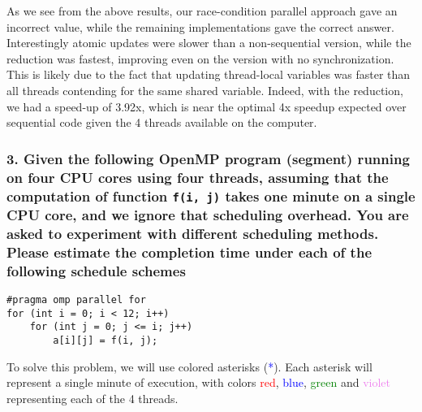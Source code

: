 \documentclass[titlepage]{article}
\def\code#1{\texttt{#1}}
\begin{document}
As we see from the above results, our race-condition parallel
approach gave an incorrect value, while the remaining
implementations gave the correct answer. Interestingly
atomic updates were slower than a non-sequential version,
while the reduction was fastest, improving even on the version
with no synchronization. This is likely due to the fact that updating
thread-local variables was faster than all threads contending for
the same shared variable. Indeed, with the reduction, we had a
speed-up of 3.92x, which is near the optimal 4x speedup expected over
sequential code given the 4 threads available on the computer.
\subsubsection*{3. Given the following OpenMP program (segment) running on 
four CPU cores using four threads, assuming that the computation of function
\code{f(i, j)} takes one minute on a single CPU core, and we ignore that scheduling
overhead. You are asked to experiment with different scheduling methods. 
Please estimate the completion time under each of the following schedule schemes}
\begin{minipage}{\linewidth}
\begin{lstlisting}[style=CStyle]
#pragma omp parallel for
for (int i = 0; i < 12; i++)
    for (int j = 0; j <= i; j++)
        a[i][j] = f(i, j);
\end{lstlisting}
\end{minipage}
To solve this problem, we will use colored asterisks (\textcolor{blue}{*}).
Each asterisk will represent a single minute of execution, with colors
\textcolor{red}{red}, \textcolor{blue}{blue}, \textcolor{green}{green} and
\textcolor{violet}{violet} representing each of the 4 threads.
\end{document}
